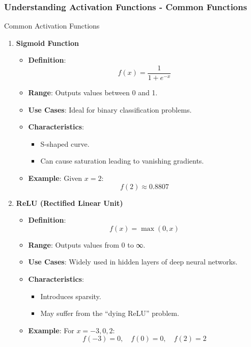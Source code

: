\documentclass[aspectratio=169]{beamer}
\begin{document}
\begin{frame}[fragile]
    \frametitle{Understanding Activation Functions - Common Functions}
    \begin{block}{Common Activation Functions}
        \begin{enumerate}
            \item \textbf{Sigmoid Function}
                \begin{itemize}
                    \item \textbf{Definition}: 
                    \[
                    f(x) = \frac{1}{1 + e^{-x}}
                    \]
                    \item \textbf{Range}: Outputs values between 0 and 1.
                    \item \textbf{Use Cases}: Ideal for binary classification problems.
                    \item \textbf{Characteristics}:
                        \begin{itemize}
                            \item S-shaped curve.
                            \item Can cause saturation leading to vanishing gradients.
                        \end{itemize}
                    \item \textbf{Example}: Given \( x = 2 \):
                    \[
                    f(2) \approx 0.8807
                    \]
                \end{itemize}
                
            \item \textbf{ReLU (Rectified Linear Unit)}
                \begin{itemize}
                    \item \textbf{Definition}: 
                    \[
                    f(x) = \max(0, x)
                    \] 
                    \item \textbf{Range}: Outputs values from 0 to ∞.
                    \item \textbf{Use Cases}: Widely used in hidden layers of deep neural networks.
                    \item \textbf{Characteristics}:
                        \begin{itemize}
                            \item Introduces sparsity.
                            \item May suffer from the “dying ReLU” problem.
                        \end{itemize}
                    \item \textbf{Example}: For \( x = -3, 0, 2 \):
                    \[
                    f(-3) = 0, \quad f(0) = 0, \quad f(2) = 2
                    \]
                \end{itemize}
        \end{enumerate}
    \end{block}
\end{frame}
\end{document}
